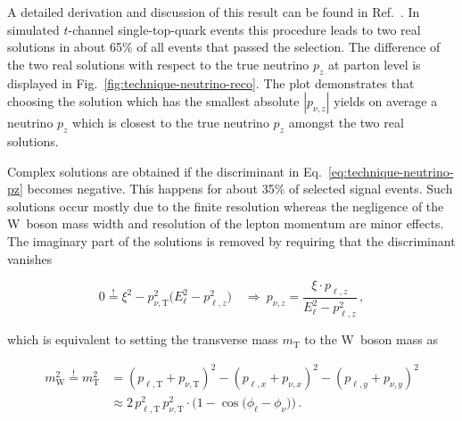 A detailed derivation and discussion of this result can be found in Ref.~\cite{Chwalek:1416031}. In simulated $t$-channel single-top-quark events this procedure leads to two real solutions in about 65\% of all events that passed the selection. The difference of the two real solutions with respect to the true neutrino $p_{z}$ at parton level is displayed in Fig.~\ref{fig:technique-neutrino-reco}. The plot demonstrates that choosing the solution which has the smallest absolute $|p_{\nu,z}|$ yields on average a neutrino $p_{z}$ which is closest to the true neutrino $p_{z}$ amongst the two real solutions.


Complex solutions are obtained if the discriminant in Eq.~\ref{eq:technique-neutrino-pz} becomes negative. This happens for about 35\% of selected signal events. Such solutions occur mostly due to the finite \met resolution whereas the negligence of the W~boson mass width and resolution of the lepton momentum are minor effects. The imaginary part of the solutions is removed by requiring that the discriminant vanishes

\begin{equation}
0\overset{!}{=}\xi^2-p_{\nu,\mathrm{T}}^2\big(E_{\ell}^2-p_{\ell,z}^2\big)\quad
\Rightarrow~ p_{\nu,z}=\frac{\xi\cdot p_{\ell,z}}{E_{\ell}^{2}-p_{\ell,z}^{2}}\,,\label{eq:technique-pz-complex}
\end{equation}

which is equivalent to setting the transverse mass $m_\mathrm{T}$ to the W~boson mass as

\begin{align}
m_\mathrm{W}^2\overset{!}{=}m_\mathrm{T}^2&=(p_{\ell,\mathrm{T}}+p_{\nu,\mathrm{T}})^2-(p_{\ell,x}+p_{\nu,x})^{2}-(p_{\ell,y}+p_{\nu,y})^{2}\nonumber\\
&\approx2\,p_{\ell,\mathrm{T}}^2\,p_{\nu,\mathrm{T}}^2\cdot\Big(1-\cos\big(\phi_\ell-\phi_\nu\big)\Big)\,.
\end{align}

